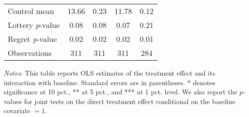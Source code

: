 \begin{table}[htbp]
{\begin{threeparttable}
\begin{tabular}{l*{4}{c}}
Control mean    &    13.66         &     0.23         &    11.78         &     0.12         \\
Lottery \emph{p}-value&     0.08         &     0.08         &     0.07         &     0.21         \\
Regret \emph{p}-value&     0.02         &     0.02         &     0.02         &     0.01         \\
Observations    &      311         &      311         &      311         &      284         \\
\bottomrule \end{tabular} \begin{tablenotes}[flushleft] \footnotesize \item \emph{Notes:} This table reports OLS estimates of the treatment effect and its interaction with baseline. Standard errors are in parentheses. * denotes significance at 10 pct., ** at 5 pct., and *** at 1 pct. level. We also report the \(p\)-values for joint tests on the direct treatment effect conditional on the baseline covariate $= 1$. \end{tablenotes} \end{threeparttable} } \end{table}

